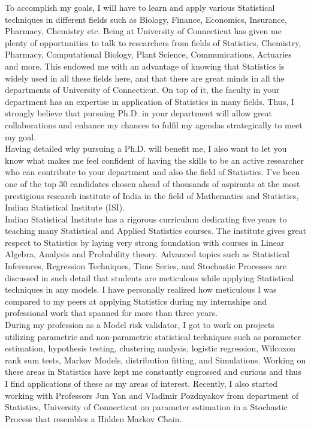 \documentclass[12pt]{article}
\begin{document}
To accomplish my goals, I will have to learn and apply various Statistical techniques in different fields such as Biology, Finance, Economics, Insurance, Pharmacy, Chemistry etc. Being at University of Connecticut has given me plenty of opportunities to talk to researchers from fields of Statistics, Chemistry, Pharmacy, Computational Biology, Plant Science, Communications, Actuaries and more. This endowed me with an advantage of knowing that Statistics is widely used in all these fields here, and that there are great minds in all the departments of University of Connecticut. On top of it, the faculty in your department has an expertise in application of Statistics in many fields. Thus, I strongly believe that pursuing Ph.D. in your department will allow great collaborations and enhance my chances to fulfil my agendas strategically to meet my goal. \\

Having detailed why pursuing a Ph.D. will benefit me, I also want to let you know what makes me feel confident of having the skills to be an active researcher who can contribute to your department and also the field of Statistics. I've been one of the top 30 candidates chosen ahead of thousands of aspirants at the most prestigious research institute of India in the field of Mathematics and Statistics, Indian Statistical Institute (ISI). \\

Indian Statistical Institute has a rigorous curriculum dedicating five years to teaching many Statistical and Applied Statistics courses.  The institute gives great respect to Statistics by laying very strong foundation with courses in Linear Algebra, Analysis and Probability theory. Advanced topics such as Statistical Inferences, Regression Techniques, Time Series, and Stochastic Processes are discussed in such detail that students are meticulous while applying Statistical techniques in any models. I have personally realized how meticulous I was compared to my peers at applying Statistics during my internships and professional work that spanned for more than three years. \\

During my profession as a Model risk validator, I got to work on projects utilizing parametric and non-parametric statistical techniques such as parameter estimation, hypothesis testing, clustering analysis, logistic regression, Wilcoxon rank sum tests, Markov Models, distribution fitting, and Simulations. Working on these areas in Statistics have kept me constantly engrossed and curious and thus I find applications of these as my areas of interest. Recently, I also started working with Professors Jun Yan and Vladimir Pozdnyakov from department of Statistics, University of Connecticut on parameter estimation in a Stochastic Process that resembles a Hidden Markov Chain. \\
\end{document}
